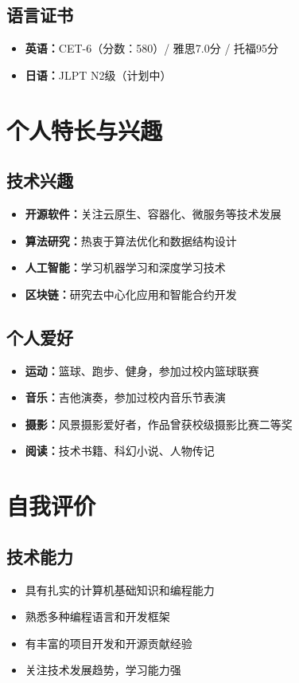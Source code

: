 \documentclass[a4paper,12pt]{article}
\begin{document}
\subsection{语言证书}
\begin{itemize}
    \item \textbf{英语：}CET-6（分数：580）/ 雅思7.0分 / 托福95分
    \item \textbf{日语：}JLPT N2级（计划中）
\end{itemize}

\section{个人特长与兴趣}

\subsection{技术兴趣}
\begin{itemize}
    \item \textbf{开源软件：}关注云原生、容器化、微服务等技术发展
    \item \textbf{算法研究：}热衷于算法优化和数据结构设计
    \item \textbf{人工智能：}学习机器学习和深度学习技术
    \item \textbf{区块链：}研究去中心化应用和智能合约开发
\end{itemize}

\subsection{个人爱好}
\begin{itemize}
    \item \textbf{运动：}篮球、跑步、健身，参加过校内篮球联赛
    \item \textbf{音乐：}吉他演奏，参加过校内音乐节表演
    \item \textbf{摄影：}风景摄影爱好者，作品曾获校级摄影比赛二等奖
    \item \textbf{阅读：}技术书籍、科幻小说、人物传记
\end{itemize}

\section{自我评价}

\subsection{技术能力}
\begin{itemize}
    \item 具有扎实的计算机基础知识和编程能力
    \item 熟悉多种编程语言和开发框架
    \item 有丰富的项目开发和开源贡献经验
    \item 关注技术发展趋势，学习能力强
\end{itemize}
\end{document}
